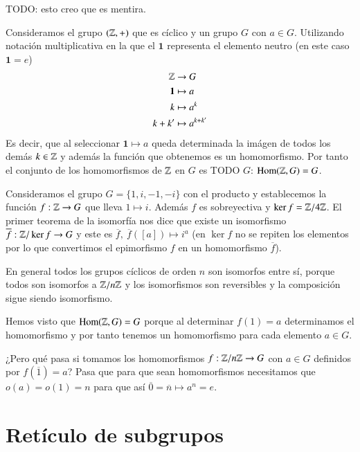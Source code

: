 \begin{ej}
	TODO: esto creo que es mentira.
	
	Consideramos el grupo $(\mathbb{Z}, +)$ que es cíclico y un grupo $G$ con $a \in G$. Utilizando notación multiplicativa en la que el $\mathbf{1}$ representa el elemento neutro (en este caso $\mathbf{1} = e$)
	\begin{align*}
	\mathbb{Z} &\to G \\
	\mathbf{1} &\mapsto a \\
	k &\mapsto a^k \\
	k + k' &\mapsto a^{k+k'}
	\end{align*}
	Es decir, que al seleccionar $\mathbf{1} \mapsto a$ queda determinada la imágen de todos los demás $k \in \mathbb{Z}$ y además la función que obtenemos es un homomorfismo. Por tanto el conjunto de los homomorfismos de $\mathbb{Z}$ en $G$ es TODO $G$: $\text{Hom}(\mathbb{Z}, G) = G$.
\end{ej}

\begin{ej}
	Consideramos el grupo $G = \{1, i, -1, -i\}$ con el producto y establecemos la función $f:\mathbb{Z} \to G$ que lleva $1 \mapsto i$. Además $f$ es sobreyectiva y $\ker f = \mathbb{Z}/4\mathbb{Z}$. El primer teorema de la isomorfía nos dice que existe un isomorfismo $\overline{f}: \mathbb{Z}/\ker f \to G$ y este es $\overline{f},\ \overline{f}([a]) \mapsto i^{a}$ (en $\ker f$ no se repiten los elementos por lo que convertimos el epimorfismo $f$ en un homomorfismo $\overline{f}$).
\end{ej}

En general todos los grupos cíclicos de orden $n$ son isomorfos entre sí, porque todos son isomorfos a $\mathbb{Z}/n\mathbb{Z}$ y los isomorfismos son reversibles y la composición sigue siendo isomorfismo.

Hemos visto que $\text{Hom}(\mathbb{Z}, G) = G$ porque al determinar $f(1) = a$ determinamos el homomorfismo y por tanto tenemos un homomorfismo para cada elemento $a \in G$.

¿Pero qué pasa si tomamos los homomorfismos $f:\mathbb{Z}/n\mathbb{Z} \to G$ con $a \in G$ definidos por $f(\overline{1}) = a$? Pasa que para que sean homomorfismos necesitamos que $o(a) = o(1) = n$ para que así $\overline{0} = \overline{n} \mapsto a^n = e$.


\section{Retículo de subgrupos}

